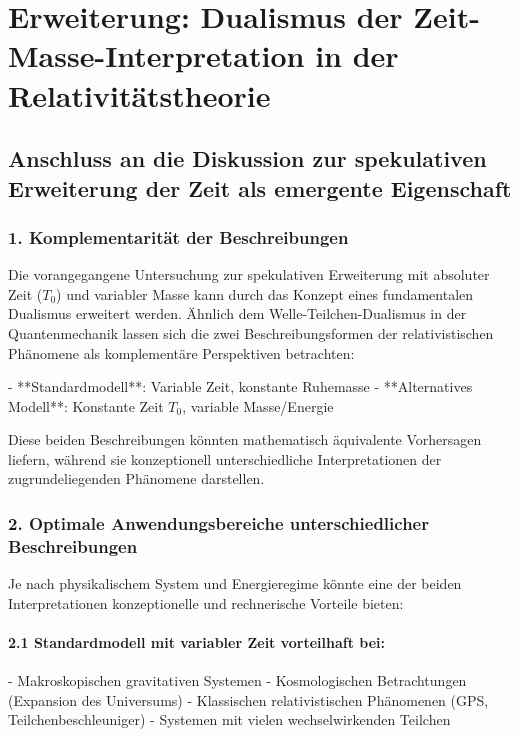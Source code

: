 \documentclass{article}
\begin{document}
	\section{Erweiterung: Dualismus der Zeit-Masse-Interpretation in der Relativitätstheorie}
	
	\subsection{Anschluss an die Diskussion zur spekulativen Erweiterung der Zeit als emergente Eigenschaft}
	
	\subsubsection{1. Komplementarität der Beschreibungen}
	
	Die vorangegangene Untersuchung zur spekulativen Erweiterung mit absoluter Zeit (\( T_0 \)) und variabler Masse kann durch das Konzept eines fundamentalen Dualismus erweitert werden. Ähnlich dem Welle-Teilchen-Dualismus in der Quantenmechanik lassen sich die zwei Beschreibungsformen der relativistischen Phänomene als komplementäre Perspektiven betrachten:
	
	- **Standardmodell**: Variable Zeit, konstante Ruhemasse
	- **Alternatives Modell**: Konstante Zeit \( T_0 \), variable Masse/Energie
	
	Diese beiden Beschreibungen könnten mathematisch äquivalente Vorhersagen liefern, während sie konzeptionell unterschiedliche Interpretationen der zugrundeliegenden Phänomene darstellen.
	
	\subsubsection{2. Optimale Anwendungsbereiche unterschiedlicher Beschreibungen}
	
	Je nach physikalischem System und Energieregime könnte eine der beiden Interpretationen konzeptionelle und rechnerische Vorteile bieten:
	
	\paragraph{2.1 Standardmodell mit variabler Zeit vorteilhaft bei:}
	- Makroskopischen gravitativen Systemen
	- Kosmologischen Betrachtungen (Expansion des Universums)
	- Klassischen relativistischen Phänomenen (GPS, Teilchenbeschleuniger)
	- Systemen mit vielen wechselwirkenden Teilchen
	
\end{document}
